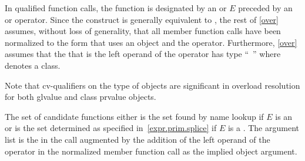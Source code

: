 \pnum
In qualified function calls,
the function is designated by
an  or  $E$
preceded by an \tcode{->} or  operator.
Since the
construct
is generally equivalent to
,
the rest of
\ref{over} assumes, without loss of generality, that all member
function calls have been normalized to the form that uses an
object and the
operator.
Furthermore, \ref{over} assumes that
the
that is the left operand of the
operator
has type ``\cv{}~''
where
denotes a class.
\begin{footnote}
Note that cv-qualifiers on the type of objects are
significant in overload
resolution for
both glvalue and class prvalue objects.
\end{footnote}
The set of candidate functions either
is the set found by name lookup
if $E$ is an  or
is the set determined as specified in~\ref{expr.prim.splice}
if $E$ is a .
The argument list is the
in the call augmented by the addition of the left operand of
the
operator in the normalized member function call as the
implied object argument.

